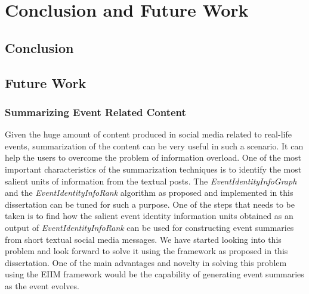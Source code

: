 
\chapter{Conclusion and Future Work} %

\label{Conclusion} %


\section{Conclusion}

\section{Future Work}

\subsection{Summarizing Event Related Content}
Given the huge amount of content produced in social media related to real-life events, summarization of the content can be very useful in such a scenario. It can help the users to overcome the problem of information overload. One of the most important characteristics of the summarization techniques is to identify the most salient units of information from the textual posts. The \textit{EventIdentityInfoGraph} and the \textit{EventIdentityInfoRank} algorithm as proposed and implemented in this dissertation can be tuned for such a purpose. One of the steps that needs to be taken is to find how the salient event identity information units obtained as an output of \textit{EventIdentityInfoRank} can be used for constructing event summaries from short textual social media messages. We have started looking into this problem and look forward to solve it using the framework as proposed in this dissertation. One of the main advantages and novelty in solving this problem using the EIIM framework would be the capability of generating event summaries as the event evolves. 


